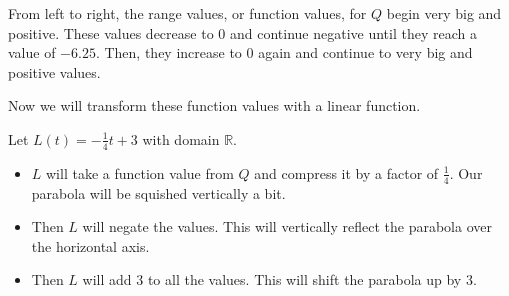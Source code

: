 \documentclass{ximera}
\begin{document}
\begin{image}
\end{image}



From left to right, the range values, or function values, for $Q$ begin very big and positive.  These values decrease to $0$ and continue negative until they reach a value of $-6.25$. Then, they increase to $0$ again and continue to very big and positive values.

Now we will transform these function values with a linear function.


Let $L(t) = -\frac{1}{4} t + 3$ with domain $\mathbb{R}$.


\begin{itemize}
\item $L$ will take a function value from $Q$ and compress it by a factor of $\frac{1}{4}$. Our parabola will be squished vertically a bit. 
\item Then $L$ will negate the values.  This will vertically reflect the parabola over the horizontal axis.
\item Then $L$ will add $3$ to all the values.  This will shift the parabola up by $3$.
\end{itemize}
\end{document}
